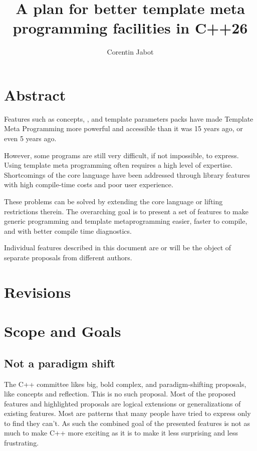 \documentclass{wg21}
\title{A plan for better template meta programming facilities in C++26}
\author{Corentin Jabot}{corentin.jabot@gmail.com}
\begin{document}
\maketitle

\section{Abstract}

Features such as concepts, , and template parameters packs have made Template Meta Programming more powerful and accessible than it was 15 years ago, or even 5 years ago.

However, some programs are still very difficult, if not impossible, to express. Using template meta programming often requires a high level of expertise.
Shortcomings of the core language have been addressed through library features with high compile-time costs and poor user experience.

These problems can be solved by extending the core language or lifting restrictions therein.
The overarching goal is to present a set of features to make generic programming and template metaprogramming easier, faster to compile, and with better compile time diagnostics.

Individual features described in this document are or will be the object of separate proposals from different authors.


\section{Revisions}

\section{Scope and Goals}

\subsection{Not a paradigm shift}

The C++ committee likes big, bold complex, and paradigm-shifting proposals, like concepts and reflection.
This is no such proposal.
Most of the proposed features and highlighted proposals are logical extensions or generalizations of existing features.
Most are patterns that many people have tried to express only to find they can't.
As such the combined goal of the presented features is not as much to make C++ more exciting as it is to make it less surprising and less frustrating.
\end{document}
